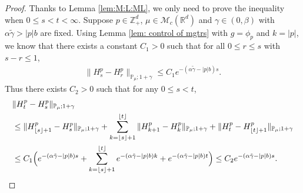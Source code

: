 \documentclass[12pt,a4paper]{amsart}
\theoremstyle{plain}
\theoremstyle{definition}
\numberwithin{equation}{section}
\begin{document}
\begin{proof}
 Thanks to Lemma \ref{lem:M:L:ML}, we only  need to prove the inequality  when $0\leq s < t<\infty$.
 Suppose $p\in \mathbb{Z}_+^d$, $\mu\in \mathcal M_c(\mathbb R^d)$ and  $\gamma \in (0,\beta)$ with $\alpha \tilde \gamma > |p|b$ are fixed.
 Using Lemma \ref{lem: control of mgtrs} with $g=\phi_p$ and $k=|p|$,  we know that
 there exists a constant $C_1>0$ such that for all $0\leq r\leq s $ with $s-r\leq1$,
\begin{align}
  \|H^p_s-H^p_r\|_{\mathbb P_\mu; 1+\gamma}
  \leq  C_1 e^{-(\alpha\tilde \gamma-|p|b)s}.
\end{align}
Thus there exists $C_2>0$ such that for any $0\leq s<t$,
\begin{align}
	& \|H^p_t-H^p_s\|_{\mathbb{P}_{\mu};1+\gamma} \\
	& \leq \|H^p_{\lfloor s \rfloor+1}-H^p_s\|_{\mathbb{P}_{\mu};1+\gamma}+\sum_{k=\lfloor s \rfloor+1}^{\lfloor t \rfloor}\|H^p_{k+1}-H^p_{k}\|_{\mathbb{P}_{\mu};1+\gamma}+\|H^p_t-H^p_{\lfloor t \rfloor+1}\|_{\mathbb{P}_{\mu};1+\gamma} \\
	& \leq C_1 \Big(e^{-(\alpha \tilde \gamma- |p|b) s}+\sum_{k=\lfloor s \rfloor+1}^{\lfloor t \rfloor} e^{-(\alpha \tilde \gamma- |p|b) k} + e^{-(\alpha \tilde \gamma-|p|b) t}\Big)
   \leq C_2e^{-(\alpha \tilde \gamma-|p|b)s}.
   \qedhere
\end{align}	
\end{proof}
\end{document}
